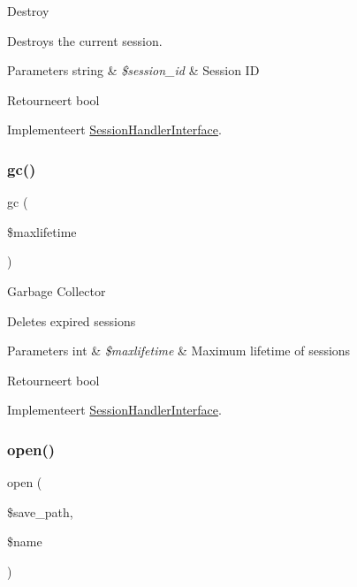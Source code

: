 Destroy

Destroys the current session.


\begin{DoxyParams}[1]{Parameters}
string & {\em \$session\+\_\+id} & Session ID \\
\hline
\end{DoxyParams}
\begin{DoxyReturn}{Retourneert}
bool 
\end{DoxyReturn}


Implementeert \mbox{\hyperlink{interface_session_handler_interface}{Session\+Handler\+Interface}}.

\mbox{\label{class_c_i___session__memcached__driver_a57aff7ee0656d8aa75d545fb8b3ae35d}} 
\subsubsection{\texorpdfstring{gc()}{gc()}}
{\footnotesize\ttfamily gc (\begin{DoxyParamCaption}\item[{}]{\$maxlifetime }\end{DoxyParamCaption})}

Garbage Collector

Deletes expired sessions


\begin{DoxyParams}[1]{Parameters}
int & {\em \$maxlifetime} & Maximum lifetime of sessions \\
\hline
\end{DoxyParams}
\begin{DoxyReturn}{Retourneert}
bool 
\end{DoxyReturn}


Implementeert \mbox{\hyperlink{interface_session_handler_interface}{Session\+Handler\+Interface}}.

\mbox{\label{class_c_i___session__memcached__driver_a614b5cf3840833913c7a73260ed28e02}} 
\subsubsection{\texorpdfstring{open()}{open()}}
{\footnotesize\ttfamily open (\begin{DoxyParamCaption}\item[{}]{\$save\+\_\+path,  }\item[{}]{\$name }\end{DoxyParamCaption})}

